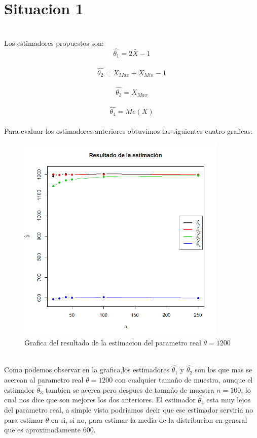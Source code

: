 \documentclass[letterpaper,12pt,onecolumn,titlepage]{article}
\begin{document}
\section{Situacion 1}
~\\ Los estimadores propuestos son:
~\ $$\hat{\theta_1}=2\bar{X}-1$$
~\ $$\hat{\theta_2}=X_{Max}+X_{Min}-1$$
~\ $$\hat{\theta_3}=X_{Max}$$
~\ $$\hat{\theta_4}=Me(X) $$
~\\ Para evaluar los estimadores anteriores obtuvimos las siguientes cuatro graficas:
\begin{figure}[!h]
    \begin{center}
        \includegraphics[width=10cm]{Figuras/A.png}
        \caption{Grafica del resultado de la estimacion del parametro real $\theta=1200$}
        \label{fig:Densidad}
    \end{center}
\end{figure}
~\\ Como podemos observar en la grafica,los estimadores $\hat{\theta_1}$ y $\hat{\theta_2}$ son los que mas se acercan al parametro real $\theta=1200$  con cualquier tama\~{n}o de muestra, aunque el estimador $\hat{\theta_3}$ tambien se acerca pero despues de tama\~{n}o de muestra $n=100$, lo cual nos dice que son mejores los dos anteriores. El estimador $\hat{\theta_4}$ esta muy lejos del parametro real, a simple vista podriamos decir que ese estimador serviria no para estimar $\theta$ en si, si no, para estimar la media de la distribucion en general que es aproximadamente 600.
\end{document}
